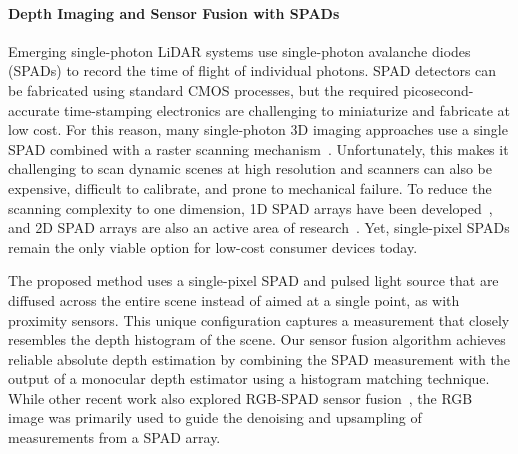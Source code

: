 \paragraph{Depth Imaging and Sensor Fusion with SPADs}
%
Emerging single-photon LiDAR systems use single-photon avalanche diodes (SPADs)
to record the time of flight of individual photons. SPAD detectors can be
fabricated using standard CMOS processes, but the required picosecond-accurate
time-stamping electronics are challenging to miniaturize and fabricate at low
cost. For this reason, many single-photon 3D imaging approaches use a single
SPAD combined with a raster scanning
mechanism~\cite{Kirmani:2014,Lamb2010,Li:2019,pawlikowska2017single,gupta2019photonflooded}.
Unfortunately, this makes it challenging to scan dynamic scenes at high
resolution and scanners can also be expensive, difficult to calibrate, and prone
to mechanical failure. To reduce the scanning complexity to one dimension, 1D
SPAD arrays have been
developed~\cite{burri2017linospad,burri2016linospad,OToole2017}, and 2D SPAD
arrays are also an active area of
research~\cite{Niclass2005,Stoppa2007,Veerappan2011,Zhang2018}. Yet,
single-pixel SPADs remain the only viable option for low-cost consumer devices
today.


The proposed method uses a single-pixel SPAD and pulsed light source that are
diffused across the entire scene instead of aimed at a single point, as with
proximity sensors. This unique configuration captures a measurement that closely
resembles the depth histogram of the scene. Our sensor fusion algorithm achieves
reliable absolute depth estimation by combining the SPAD measurement with the
output of a monocular depth estimator using a histogram matching technique.
While other recent work also explored RGB-SPAD sensor fusion~\cite{Lindell2018},
the RGB image was primarily used to guide the denoising and upsampling of
measurements from a SPAD array.

 


